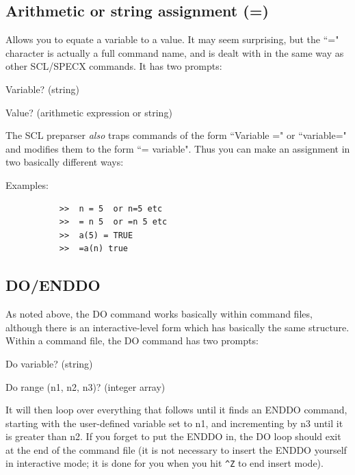 \documentclass[11pt,twoside]{report}
\begin{document}
\subsection{Arithmetic or string assignment (=)}\index{=}

Allows you to equate a variable to a value. It may seem surprising, but the
``=" character is actually a full command name, and is dealt with in the same
way as other SCL/SPECX commands. It has two prompts:
\begin{description}
\item{}           Variable?  (string)
\item{}           Value?     (arithmetic expression or string)
\end{description}

The SCL preparser {\em also} traps commands of the form
``Variable =" or ``variable=" and modifies them to the form ``= variable". Thus
you can make an assignment in two basically different ways: 

Examples: 
\begin{verbatim}
           >>  n = 5  or n=5 etc
           >>  = n 5  or =n 5 etc
           >>  a(5) = TRUE
           >>  =a(n) true
\end{verbatim}


\subsection{DO/ENDDO}

As noted above, the DO command works basically within command files, although
there is an interactive-level form which has basically the same structure.
Within a command file, the DO command has two
prompts: 
\begin{description}
\item{}             Do variable?             (string)
\item{}             Do range (n1, n2, n3)?   (integer array)
\end{description}

It will then loop over everything that follows until it finds an ENDDO command,
starting with the user-defined variable set to n1, and incrementing by n3 until
it is greater than n2. If you forget to put the ENDDO in, the DO loop should
exit at the end of the command file (it is not necessary to insert the ENDDO
yourself in interactive mode; it is done for you when you hit
\verb+^Z+ to end insert mode). 
\end{document}
